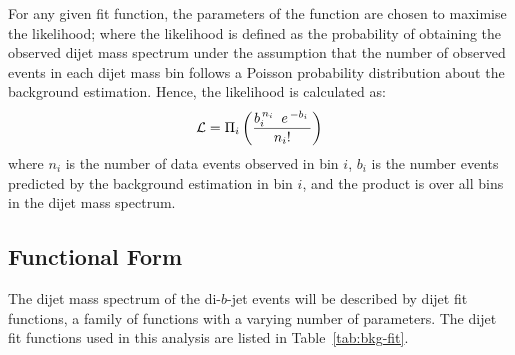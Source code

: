 For any given fit function, the parameters of the function are chosen to maximise the likelihood;
where the likelihood is defined as the probability of obtaining the observed dijet mass spectrum under the assumption that
the number of observed events in each dijet mass bin follows a Poisson probability distribution about the background estimation.
Hence, the likelihood is calculated as:
\begin{equation}
  \large {\ensuremath{\mathcal{L}}=  \Pi_i \left(  \frac{b_i^{\,n_i\,}~e^{\,-b_i\,}}{n_i!} \right)}
  \label{eqn:bkg-like}
\end{equation}
where $n_i$ is the number of data events observed in bin $i$,
$b_i$ is the number events predicted by the background estimation in bin $i$,
and the product is over all bins in the dijet mass spectrum.

\subsection{Functional Form}
\label{sec:bkg-func}



The dijet mass spectrum of the di-$b$-jet events will be described by dijet fit functions,
a family of functions with a varying number of parameters.
The dijet fit functions used in this analysis are listed in Table~\ref{tab:bkg-fit}.

